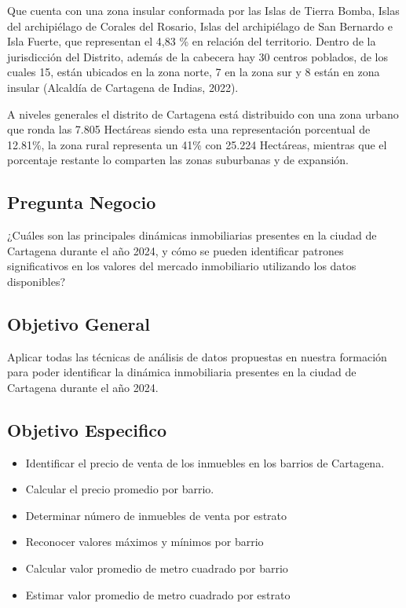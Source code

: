 \documentclass[12pt,a4paper]{article}
\begin{document}
Que cuenta con una zona insular conformada por las Islas de Tierra Bomba, Islas del archipiélago de Corales del Rosario, Islas del archipiélago de San Bernardo e Isla Fuerte, que representan el 4,83 \% en relación del territorio. Dentro de la jurisdicción del Distrito, además de la cabecera hay 30 centros poblados, de los cuales 15, están ubicados en la zona norte, 7 en la zona sur y 8 están en zona insular (Alcaldía de Cartagena de Indias, 2022).

A niveles generales el distrito de Cartagena está distribuido con una zona urbano que ronda las 7.805 Hectáreas siendo esta una representación porcentual de 12.81\%, la zona rural representa un 41\% con 25.224 Hectáreas, mientras que el porcentaje restante lo comparten las zonas suburbanas y de expansión.

\subsection{Pregunta Negocio}
¿Cuáles son las principales dinámicas inmobiliarias presentes en la ciudad de Cartagena durante el año 2024, y cómo se pueden identificar patrones significativos en los valores del mercado inmobiliario utilizando los datos disponibles?
\subsection{Objetivo General}
Aplicar todas las técnicas de análisis de datos propuestas en nuestra formación para poder identificar la dinámica inmobiliaria presentes en la ciudad de Cartagena durante el año 2024. 

\subsection{Objetivo Especifico}
\begin{itemize}
	\item	Identificar el precio de venta de los inmuebles en los barrios de Cartagena.
	\item Calcular el precio promedio por barrio.
	\item Determinar número de inmuebles de venta por estrato
	\item Reconocer valores máximos y mínimos por barrio
	\item Calcular valor promedio de metro cuadrado por barrio
	\item Estimar valor promedio de metro cuadrado por estrato
\end{itemize}
\end{document}
